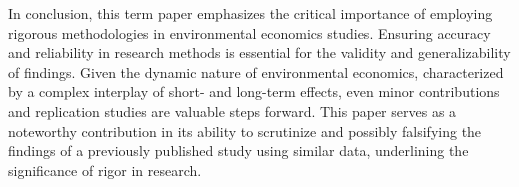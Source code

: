 \documentclass[12pt,a4paper]{article}
\begin{document}
{In conclusion, this term paper emphasizes the critical importance of employing rigorous methodologies in environmental economics studies. Ensuring accuracy and reliability in research methods is essential for the validity and generalizability of findings. Given the dynamic nature of environmental economics, characterized by a complex interplay of short- and long-term effects, even minor contributions and replication studies are valuable steps forward. This paper serves as a noteworthy contribution in its ability to scrutinize and possibly falsifying the findings of a previously published study using similar data, underlining the significance of rigor in research.

\clearpage


\setcounter{page}{\thesavepage}
\pagestyle{plain}


\clearpage

\appendix
}
\end{document}
